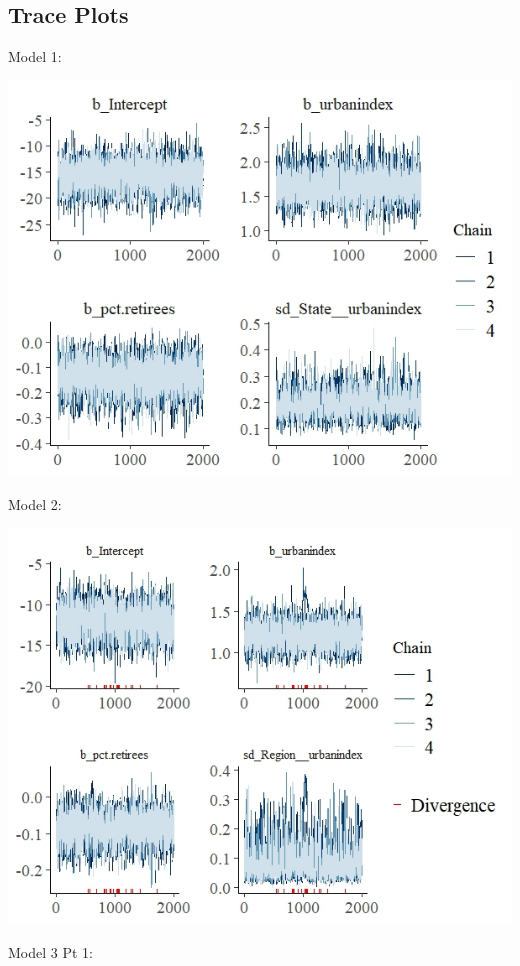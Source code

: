 \documentclass[12pt]{article}
\begin{document}
\clearpage
\FloatBarrier
\subsection*{Trace Plots}

Model 1:

\includegraphics[scale = 1.25]{trace_plots/trace_model1.jpeg}

Model 2:

\includegraphics[scale = 1.4]{trace_plots/trace_model2.jpeg}

Model 3 Pt 1:
\end{document}
